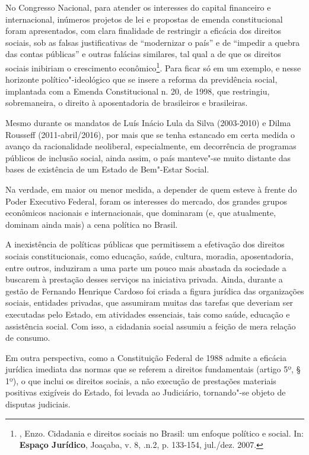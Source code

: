 No Congresso Nacional, para atender os interesses do capital financeiro
e internacional, inúmeros projetos de lei e propostas de emenda
constitucional foram apresentados, com clara finalidade de restringir a
eficácia dos direitos sociais, sob as falsas justificativas de
``modernizar o país'' e de ``impedir a quebra das contas públicas'' e
outras falácias similares, tal qual a de que os direitos sociais
inibiriam o crescimento econômico\footnote{, Enzo. Cidadania e
  direitos sociais no Brasil: um enfoque político e social. In:
  \textbf{Espaço Jurídico}, Joaçaba, v. 8, .n.2, p. 133-154, jul./dez.
  2007.}. Para ficar só em um exemplo, e nesse horizonte
político"-ideológico que se insere a reforma da previdência social,
implantada com a Emenda Constitucional n. 20, de 1998, que restringiu,
sobremaneira, o direito à aposentadoria de brasileiros e brasileiras.

Mesmo durante os mandatos de Luís Inácio Lula da Silva (2003-2010) e
Dilma Rousseff (2011-abril/2016), por mais que se tenha estancado em
certa medida o avanço da racionalidade neoliberal, especialmente, em
decorrência de programas públicos de inclusão social, ainda assim, o
país manteve"-se muito distante das bases de existência de um Estado de
Bem"-Estar Social.

Na verdade, em maior ou menor medida, a depender de quem esteve à frente
do Poder Executivo Federal, foram os interesses do mercado, dos grandes
grupos econômicos nacionais e internacionais, que dominaram (e, que
atualmente, dominam ainda mais) a cena política no Brasil.

A inexistência de políticas públicas que permitissem a efetivação dos
direitos sociais constitucionais, como educação, saúde, cultura,
moradia, aposentadoria, entre outros, induziram a uma parte um pouco
mais abastada da sociedade a buscarem à prestação desses serviços na
iniciativa privada. Ainda, durante a gestão de Fernando Henrique Cardoso
foi criada a figura jurídica das organizações sociais, entidades
privadas, que assumiram muitas das tarefas que deveriam ser executadas
pelo Estado, em atividades essenciais, tais como saúde, educação e
assistência social. Com isso, a cidadania social assumiu a feição de
mera relação de consumo.

Em outra perspectiva, como a Constituição Federal de 1988 admite a
eficácia jurídica imediata das normas que se referem a direitos
fundamentais (artigo 5º, § 1º), o que inclui os direitos sociais, a não
execução de prestações materiais positivas exigíveis do Estado, foi
levada ao Judiciário, tornando"-se objeto de disputas judiciais.

